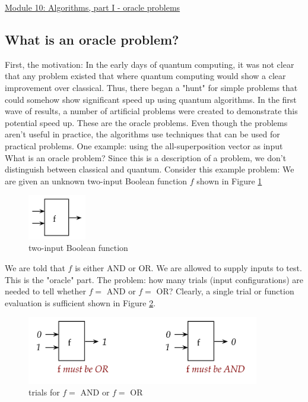 \documentclass[main.tex]{subfiles}
\begin{document}
\href{https://www2.seas.gwu.edu/~simhaweb/quantum/modules/module10/module10.html}{Module 10: Algorithms, part I - oracle problems}

\subsection{What is an oracle problem?}
    
    First, the motivation: In the early days of quantum computing, it was not clear that any problem existed that where quantum computing would show a clear improvement over classical. Thus, there began a "hunt" for simple problems that could somehow show significant speed up using quantum algorithms. In the first wave of results, a number of artificial problems were created to demonstrate this potential speed up. These are the oracle problems. Even though the problems aren't useful in practice, the algorithms use techniques that can be used for practical problems. One example: using the all-superposition vector as input
    What is an oracle problem? Since this is a description of a problem, we don't distinguish between classical and quantum. Consider this example problem: We are given an unknown two-input Boolean function $f$ shown in Figure \ref{fig:01oracle1}
    
    \begin{figure}
        \centering
        \includegraphics[width=1in]{notes/figs/n11/01oracle1.png}
        \caption{two-input Boolean function}
        \label{fig:01oracle1}
    \end{figure}
    
    We are told that $f$ is either AND or OR. We are allowed to supply inputs to test. This is the "oracle" part. The problem: how many trials (input configurations) are needed to tell whether $f=$ AND or $f=$ OR? Clearly, a single trial or function evaluation is sufficient shown in Figure \ref{fig:02oracle2}.
    
      \begin{figure}
        \centering
        \includegraphics[width=4in]{notes/figs/n11/02oracle2.png}
        \caption{trials for $f=$ AND or $f=$ OR}
        \label{fig:02oracle2}
    \end{figure}
    
\end{document}
